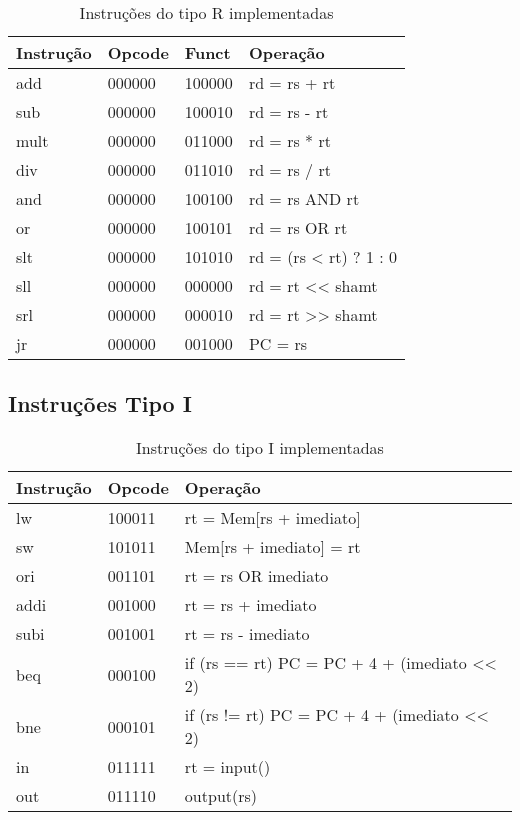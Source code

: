 \documentclass[
	12pt,				%
	oneside,
	a4paper,			%
	english,			%
	french,				%
	spanish,			%
	brazil,				%
	]{abntex2}
\begin{document}
\begin{table}[H]
\centering
\caption{Instruções do tipo R implementadas}
\begin{tabular}{|l|l|l|l|}
\hline
\textbf{Instrução} & \textbf{Opcode} & \textbf{Funct} & \textbf{Operação} \\
\hline
add & 000000 & 100000 & rd = rs + rt \\
\hline
sub & 000000 & 100010 & rd = rs - rt \\
\hline
mult & 000000 & 011000 & rd = rs * rt \\
\hline
div & 000000 & 011010 & rd = rs / rt \\
\hline
and & 000000 & 100100 & rd = rs AND rt \\
\hline
or & 000000 & 100101 & rd = rs OR rt \\
\hline
slt & 000000 & 101010 & rd = (rs < rt) ? 1 : 0 \\
\hline
sll & 000000 & 000000 & rd = rt << shamt \\
\hline
srl & 000000 & 000010 & rd = rt >> shamt \\
\hline
jr & 000000 & 001000 & PC = rs \\
\hline
\end{tabular}
\end{table}

\subsection{Instruções Tipo I}

\begin{table}[H]
\centering
\caption{Instruções do tipo I implementadas}
\begin{tabular}{|l|l|l|}
\hline
\textbf{Instrução} & \textbf{Opcode} & \textbf{Operação} \\
\hline
lw & 100011 & rt = Mem[rs + imediato] \\
\hline
sw & 101011 & Mem[rs + imediato] = rt \\
\hline
ori & 001101 & rt = rs OR imediato \\
\hline
addi & 001000 & rt = rs + imediato \\
\hline
subi & 001001 & rt = rs - imediato \\
\hline
beq & 000100 & if (rs == rt) PC = PC + 4 + (imediato << 2) \\
\hline
bne & 000101 & if (rs != rt) PC = PC + 4 + (imediato << 2) \\
\hline
in & 011111 & rt = input() \\
\hline
out & 011110 & output(rs) \\
\hline
\end{tabular}
\end{table}
\end{document}

